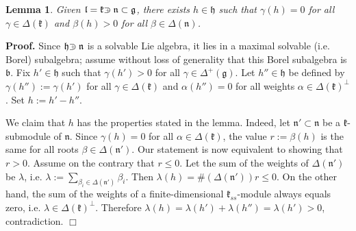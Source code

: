 \documentclass[12pt]{report}
\newtheorem{lemma}[theo]{Lemma}
\newenvironment{proof}[1][]{ \textbf{Proof#1. }}{$\Box$\medskip}
\newcommand{\kk}{\mathfrak{k}}
\newcommand{\nn}{\mathfrak{n}}
\newcommand{\hh}{\mathfrak{h}}
\newcommand{\gG}{\mathfrak{g}}
\newcommand{\bb}{\mathfrak{b}}
\newcommand{\lL}{\mathfrak{l}}
\def\crplus{\hbox{$\supset${\raise1.05pt\hbox{\kern -0.60em ${\scriptscriptstyle +}$}}\ }}
\begin{document}
\begin{lemma}\label{leNilradicalIsSeparate}
Given $\lL=\kk\crplus\nn\subset\gG$, there exists $h\in\hh$ such that $\gamma(h)=0$ for all $\gamma\in\Delta(\kk)$ and $\beta(h)>0$ for all $\beta\in\Delta(\nn)$.
\end{lemma}
\begin{proof}
Since $\hh\crplus\nn$ is a solvable Lie algebra, it lies in a maximal solvable (i.e. Borel) subalgebra; assume without loss of generality that this Borel subalgebra is $\bb$. Fix $h'\in\hh$ such that $\gamma(h')>0$ for all $\gamma\in \Delta^+(\gG)$. Let $h''\in\hh$ be defined by $\gamma(h''):=\gamma(h')$ for all $\gamma\in\Delta(\kk)$ and $\alpha(h'')=0$ for all weights $\alpha \in \Delta(\kk)^\perp$. Set $h:=h'-h''$. 

We claim that $h$ has the properties stated in the lemma. Indeed, let $\nn'\subset\nn$ be a $\kk$-submodule of $\nn$. Since $\gamma(h)=0$ for all $\alpha \in \Delta(\kk)$, the value $r:=\beta(h)$ is the same for all roots $\beta\in\Delta(\nn')$. Our statement is now equivalent to showing that $r>0$. Assume on the contrary that $r\leq 0$. Let the sum of the weights of $\Delta(\nn')$ be  $\lambda$, i.e. $\lambda:=\sum_{ \beta_i \in \Delta(\nn')}\beta_i$. Then $\lambda(h)= \#(\Delta(\nn'))r\leq 0$. On the other hand, the sum of the weights of a finite-dimensional $\kk_{ss}$-module always equals zero, i.e. $\lambda\in \Delta(\kk)^\perp$. Therefore $\lambda(h)=\lambda(h')+\lambda(h'')=\lambda(h')>0$, contradiction.
\end{proof}
\end{document}
